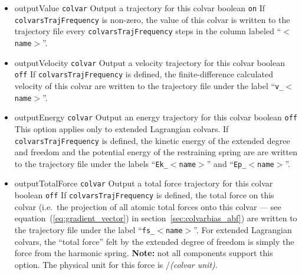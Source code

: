 \begin{itemize}
\item %
  \keydef
    {outputValue}{%
    \texttt{colvar}}{%
    Output a trajectory for this colvar}{%
    boolean}{%
    \texttt{on}}{%
    If \texttt{colvarsTrajFrequency} is non-zero, the value of this
    colvar is written to the trajectory file every
    \texttt{colvarsTrajFrequency} steps in the column labeled
    ``$<$\texttt{name}$>$''.}

\item %
  \keydef
    {outputVelocity}{%
    \texttt{colvar}}{%
    Output a velocity trajectory for this colvar}{%
    boolean}{%
    \texttt{off}}{%
    If \texttt{colvarsTrajFrequency} is defined, the
    finite-difference calculated velocity of this colvar are written
    to the trajectory file under the label
    ``\texttt{v\_}$<$\texttt{name}$>$''.}

\item %
  \keydef
    {outputEnergy}{%
    \texttt{colvar}}{%
    Output an energy trajectory for this colvar}{%
    boolean}{%
    \texttt{off}}{%
    This option applies only to extended Lagrangian colvars. If
    \texttt{colvarsTrajFrequency} is defined, the kinetic energy of
    the extended degree and freedom and the potential energy of the
    restraining spring are are written to the trajectory file under
    the labels ``\texttt{Ek\_}$<$\texttt{name}$>$'' and
    ``\texttt{Ep\_}$<$\texttt{name}$>$''.}

\item %
  \keydef
    {outputTotalForce}{%
    \texttt{colvar}}{%
    Output a total force trajectory for this
    colvar}{%
    boolean}{%
    \texttt{off}}{%
    If \texttt{colvarsTrajFrequency} is defined, the total force on this
    colvar (i.e.~the projection of all atomic total forces
    onto this colvar --- see
    equation~(\ref{eq:gradient_vector}) in
    section~\ref{sec:colvarbias_abf}) are written to the trajectory
    file under the label ``\texttt{fs\_}$<$\texttt{name}$>$''.
    For extended Lagrangian colvars, the ``total force'' felt by the extended degree of freedom
    is simply the force from the harmonic spring.
    \textbf{Note:} not all components support this option.  The
    physical unit for this force is \energyunit/\textit{(colvar unit)}.}


\end{itemize}
